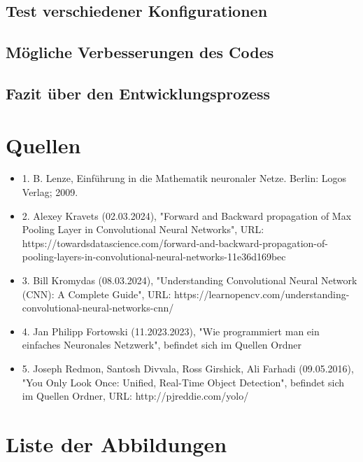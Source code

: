 \documentclass[12pt]{article}
\begin{document}
\subsection{Test verschiedener Konfigurationen}


\subsection{Mögliche Verbesserungen des Codes}

\subsection{Fazit über den Entwicklungsprozess}














\cleardoublepage
\sloppy
\section{Quellen}
\begin{itemize}
\item 1. B. Lenze, Einführung in die Mathematik neuronaler Netze. Berlin: Logos Verlag; 2009.
\item 2. Alexey Kravets (02.03.2024), "Forward and Backward propagation of Max Pooling Layer in Convolutional Neural Networks", URL: https://towardsdatascience.com/forward-and-backward-propagation-of-pooling-layers-in-convolutional-neural-networks-11e36d169bec
\item 3. Bill Kromydas (08.03.2024), "Understanding Convolutional Neural Network (CNN): A Complete Guide", URL: https://learnopencv.com/understanding-convolutional-neural-networks-cnn/
\item 4. Jan Philipp Fortowski (11.2023.2023), "Wie programmiert man ein einfaches Neuronales Netzwerk", befindet sich im Quellen Ordner
\item 5. Joseph Redmon, Santosh Divvala, Ross Girshick, Ali Farhadi (09.05.2016), "You Only Look Once:
Unified, Real-Time Object Detection", befindet sich im Quellen Ordner, URL: http://pjreddie.com/yolo/


\end{itemize}

\cleardoublepage
\section{Liste der Abbildungen}
\listoffigures
\end{document}
